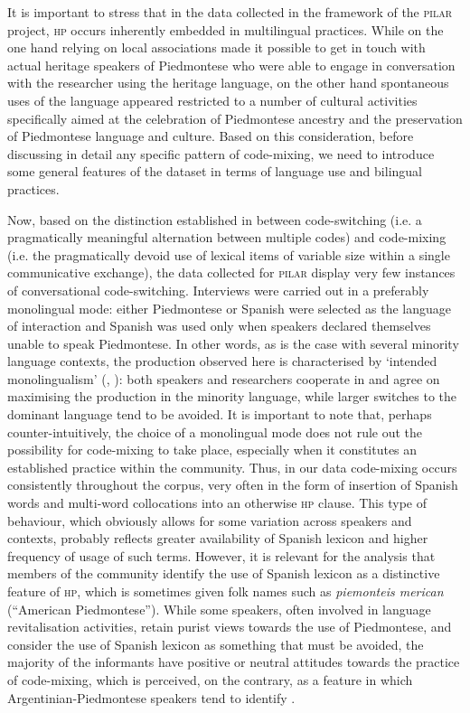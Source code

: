 \documentclass[output=paper]{langscibook}
\begin{document}
It is important to stress that in the data collected in the framework of the \textsc{pilar} project, \textsc{hp} occurs inherently embedded in multilingual practices. While on the one hand relying on local associations made it possible to get in touch with actual heritage speakers of Piedmontese who were able to engage in conversation with the researcher using the heritage language, on the other hand spontaneous uses of the language appeared restricted to a number of cultural activities specifically aimed at the celebration of Piedmontese ancestry and the preservation of Piedmontese language and culture. Based on this consideration, before discussing in detail any specific pattern of code-mixing, we need to introduce some general features of the dataset in terms of language use and bilingual practices.

Now, based on the distinction established in  between code-switching (i.e. a pragmatically meaningful alternation between multiple codes) and code-mixing (i.e. the pragmatically devoid use of lexical items of variable size within a single communicative exchange), the data collected for \textsc{pilar} display very few instances of conversational code-switching. Interviews were carried out in a preferably monolingual mode: either Piedmontese or Spanish were selected as the language of interaction and Spanish was used only when speakers declared themselves unable to speak Piedmontese. In other words, as is the case with several minority language contexts, the production observed here is characterised by ‘intended monolingualism’ (\citealt{Negro2013}, \citealt{Clyne2003}): both speakers and researchers cooperate in and agree on maximising the production in the minority language, while larger switches to the dominant language tend to be avoided. It is important to note that, perhaps counter-intuitively, the choice of a monolingual mode does not rule out the possibility for code-mixing to take place, especially when it constitutes an established practice within the community. Thus, in our data code-mixing occurs consistently throughout the corpus, very often in the form of insertion of Spanish words and multi-word collocations into an otherwise \textsc{hp} clause. This type of behaviour, which obviously allows for some variation across speakers and contexts, probably reflects greater availability of Spanish lexicon and higher frequency of usage of such terms. However, it is relevant for the analysis that members of the community identify the use of Spanish lexicon as a distinctive feature of \textsc{hp}, which is sometimes given folk names such as \textit{piemonteis merican} (“American Piedmontese”). While some speakers, often involved in language revitalisation activities, retain purist views towards the use of Piedmontese, and consider the use of Spanish lexicon as something that must be avoided, the majority of the informants have positive or neutral attitudes towards the practice of code-mixing, which is perceived, on the contrary, as a feature in which Argentinian-Piedmontese speakers tend to identify \citep{Goria2023}.
\end{document}
